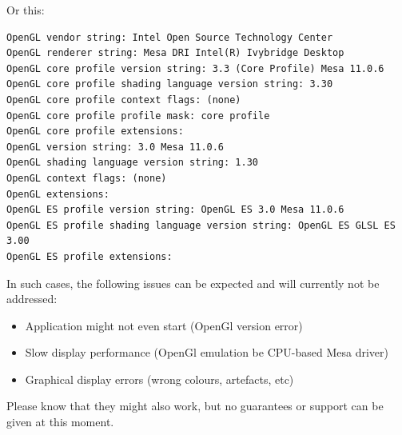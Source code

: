 Or this:

\begin{lstlisting}
OpenGL vendor string: Intel Open Source Technology Center
OpenGL renderer string: Mesa DRI Intel(R) Ivybridge Desktop 
OpenGL core profile version string: 3.3 (Core Profile) Mesa 11.0.6
OpenGL core profile shading language version string: 3.30
OpenGL core profile context flags: (none)
OpenGL core profile profile mask: core profile
OpenGL core profile extensions:
OpenGL version string: 3.0 Mesa 11.0.6
OpenGL shading language version string: 1.30
OpenGL context flags: (none)
OpenGL extensions:
OpenGL ES profile version string: OpenGL ES 3.0 Mesa 11.0.6
OpenGL ES profile shading language version string: OpenGL ES GLSL ES 3.00
OpenGL ES profile extensions:
\end{lstlisting}

In such cases, the following issues can be expected and will currently not be addressed:

\begin{itemize} 
\item Application might not even start (OpenGl version error)
\item Slow display performance (OpenGl emulation be CPU-based Mesa driver)
\item Graphical display errors (wrong colours, artefacts, etc) 
\end{itemize} 

Please know that they might also work, but no guarantees or support can be given at this moment. 
